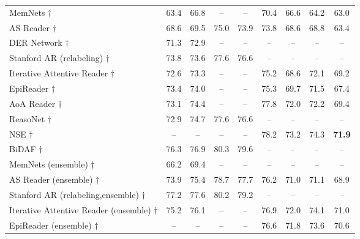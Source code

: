 \documentclass[11pt,a4paper]{article}
\begin{document}
\begin{table*}[ht]
\begin{tabular}{@{}l|cc|cc|cc|cc@{}}
MemNets $\dagger$                  & 63.4                     & 66.8                      & --                        & --                         & 70.4                  & 66.6                   & 64.2                  & 63.0                  \\
AS Reader $\dagger$              & 68.6                     & 69.5                      & 75.0                     & 73.9                      & 73.8                  & 68.6                   & 68.8                  & 63.4                  \\
DER Network $\dagger$                                   & 71.3                     & 72.9                      & --                        & --                         & --                     & --                      & --                     & --                     \\ 
Stanford AR (relabeling) $\dagger$	& 	73.8	&	73.6	&	77.6	&	76.6	&	--	&	--	&	--	&	--	\\
Iterative Attentive Reader $\dagger$	&	72.6	&	73.3	&	--	&	--	&	75.2	&	68.6	&	72.1	&	69.2 \\
EpiReader $\dagger$	&	73.4	&	74.0	&	--	&	--	&	75.3	&	69.7	&	71.5	&	67.4 \\
AoA Reader $\dagger$ &	73.1	&	74.4	&	--	&	--	&	77.8	&	72.0	&	72.2	&	69.4	\\ 
ReasoNet $\dagger$ &	72.9	&	74.7	&	77.6	&	76.6	&	--	&	--	&	--	&	--	\\
NSE $\dagger$ &	--	&	--	&	--	&	--	&	78.2	&	73.2	&	74.3	&	\textbf{71.9} \\
BiDAF $\dagger$ &	76.3 & 76.9 & 80.3 & 79.6 &	--	&	--	&	--	&	--	\\ \midrule
MemNets (ensemble) $\dagger$                    & 66.2                     & 69.4                      & --                        & --                         & --                     & --                      & --                     & --                     \\ 
AS Reader (ensemble) $\dagger$                  & 73.9                     & 75.4                      & 78.7                     & 77.7             & 76.2                  & 71.0                   & 71.1                  & 68.9                  \\ 
Stanford AR (relabeling,ensemble) $\dagger$	& 	77.2	&	77.6	&	80.2	&	79.2	&	--	&	--	&	--	&	--	\\ 
Iterative Attentive Reader (ensemble) $\dagger$	&	75.2	&	76.1	&	--	&	--	&	76.9	&	72.0	&	74.1	&	71.0 \\ 
EpiReader (ensemble) $\dagger$	&	--	&	--	&	--	&	--	&	76.6	&	71.8	&	73.6	&	70.6 \\ \midrule

\end{tabular}
\end{table*}
\end{document}
